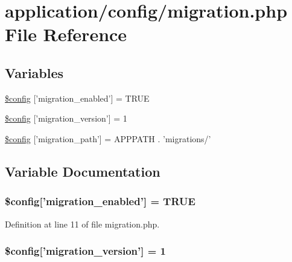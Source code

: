 \hypertarget{application_2config_2migration_8php}{\section{application/config/migration.php File Reference}
\label{application_2config_2migration_8php}
}
\subsection*{Variables}
\begin{DoxyCompactItemize}
\item 
\hyperlink{application_2config_2migration_8php_ad6392796c28d7391c3977c2cceef3cc2}{\$config} \mbox{[}'migration\-\_\-enabled'\mbox{]} = T\-R\-U\-E
\item 
\hyperlink{application_2config_2migration_8php_a53ca48939aaf8c92f0c0d239a294fff2}{\$config} \mbox{[}'migration\-\_\-version'\mbox{]} = 1
\item 
\hyperlink{application_2config_2migration_8php_abc04383313304e348060a7ee39f5a8ee}{\$config} \mbox{[}'migration\-\_\-path'\mbox{]} = A\-P\-P\-P\-A\-T\-H . 'migrations/'
\end{DoxyCompactItemize}


\subsection{Variable Documentation}
\hypertarget{application_2config_2migration_8php_ad6392796c28d7391c3977c2cceef3cc2}{
\subsubsection[{\$config}]{\setlength{\rightskip}{0pt plus 5cm}\$config\mbox{[}'migration\-\_\-enabled'\mbox{]} = T\-R\-U\-E}}\label{application_2config_2migration_8php_ad6392796c28d7391c3977c2cceef3cc2}


Definition at line 11 of file migration.\-php.

\hypertarget{application_2config_2migration_8php_a53ca48939aaf8c92f0c0d239a294fff2}{
\subsubsection[{\$config}]{\setlength{\rightskip}{0pt plus 5cm}\$config\mbox{[}'migration\-\_\-version'\mbox{]} = 1}}\label{application_2config_2migration_8php_a53ca48939aaf8c92f0c0d239a294fff2}



